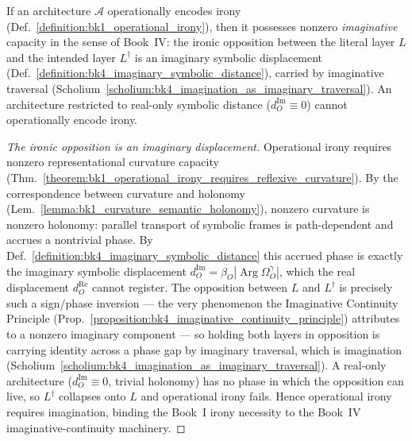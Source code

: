 \begin{theorem}
\label{theorem:bk1_operational_irony_requires_imagination}
If an architecture $\mathcal{A}$ operationally encodes irony
(Def.~\ref{definition:bk1_operational_irony}), then it possesses nonzero
\emph{imaginative} capacity in the sense of Book~IV: the ironic opposition
between the literal layer $L$ and the intended layer $L^{\dagger}$ is an
imaginary symbolic displacement (Def.~\ref{definition:bk4_imaginary_symbolic_distance}),
carried by imaginative traversal
(Scholium~\ref{scholium:bk4_imagination_as_imaginary_traversal}). An architecture
restricted to real-only symbolic distance ($d_O^{\mathrm{Im}}\equiv 0$) cannot
operationally encode irony.
\end{theorem}
\begin{proof}[The ironic opposition is an imaginary displacement]
\label{proof:bk1_operational_irony_requires_imagination}
\leavevmode
Operational irony requires nonzero representational curvature capacity
(Thm.~\ref{theorem:bk1_operational_irony_requires_reflexive_curvature}). By the
correspondence between curvature and holonomy
(Lem.~\ref{lemma:bk1_curvature_semantic_holonomy}), nonzero curvature is nonzero
holonomy: parallel transport of symbolic frames is path-dependent and accrues a
nontrivial phase. By Def.~\ref{definition:bk4_imaginary_symbolic_distance} this
accrued phase is exactly the imaginary symbolic displacement
$d_O^{\mathrm{Im}}=\beta_O|\operatorname{Arg}\Omega_O^\gamma|$, which the real
displacement $d_O^{\mathrm{Re}}$ cannot register. The opposition between $L$ and
$L^{\dagger}$ is precisely such a sign/phase inversion --- the very phenomenon the
Imaginative Continuity Principle
(Prop.~\ref{proposition:bk4_imaginative_continuity_principle}) attributes to a
nonzero imaginary component --- so holding both layers in opposition is carrying
identity across a phase gap by imaginary traversal, which is imagination
(Scholium~\ref{scholium:bk4_imagination_as_imaginary_traversal}). A real-only
architecture ($d_O^{\mathrm{Im}}\equiv 0$, trivial holonomy) has no phase in which
the opposition can live, so $L^{\dagger}$ collapses onto $L$ and operational irony
fails. Hence operational irony requires imagination, binding the Book~I irony
necessity to the Book~IV imaginative-continuity machinery.
\end{proof}

